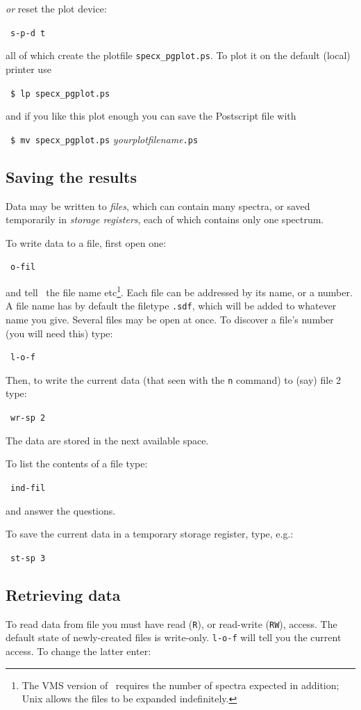 {\it{or}} reset the plot device:

\SP\ {\tt{s-p-d t}}

all of which create the plotfile \verb|specx_pgplot.ps|. 
To plot it on the default (local) printer use

\SP\ \verb|$ lp specx_pgplot.ps|

and if you like this plot enough you can save the Postscript file with

\SP\ \verb|$ mv specx_pgplot.ps| {\it{yourplotfilename}}{\tt{.ps}}

\normalmarginpar
\subsection{Saving the results}
Data may be written to {\it{files}}, which can contain many spectra, or
saved temporarily in {\it{storage registers}}, each of which contains
only one spectrum. 

To write data to a file, first open one:

\SP\ {\tt{o-fil}}

and tell \SPECX\ the file name etc\footnote{The VMS version of \SPECX\
requires the number of spectra expected in addition; Unix allows the
files to be expanded indefinitely.}. Each file can be addressed by its
name, or a number. A file name has by default the filetype {\tt{.sdf}},
which will be added to whatever name you give. Several files may be
open at once. To discover a file's number (you will need this) type:

\SP\ {\tt{l-o-f}}

Then, to write the current data (that seen with the {\tt{n}} command)
to (say) file 2 type:

\SP\ {\tt{wr-sp 2}}

The data are stored in the next available space.

To list the contents of a file type:

\SP\ {\tt{ind-fil}}

and answer the questions.

To save the current data in a temporary storage
register, type, e.g.:

\SP\ {\tt{st-sp 3}}

\subsection{Retrieving data}
To read data from file you must have read ({\tt{R}}), or read-write
({\tt{RW}}), access. The default state of newly-created files is
write-only. {\tt{l-o-f}} will tell you the current access. To
change the latter enter:

